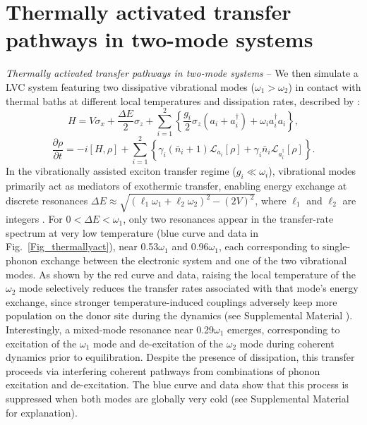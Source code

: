 \documentclass[
reprint,
superscriptaddress,

amsmath,amssymb,
aps,
prl,

floatfix,
]{revtex4-2}
\begin{document}
\section{Thermally activated transfer pathways in two-mode systems}
\fi
\emph{Thermally activated transfer pathways in two-mode systems} -- We then simulate a LVC system featuring two dissipative vibrational modes ($\omega_1>
\omega_2$) in contact with thermal baths at different local temperatures and dissipation rates, described by \cite{so2025multimode}:
\begin{equation}
    H \!= V\sigma_x\! + \frac{\Delta E}{2}\sigma_z \!+ \sum_{i=1}^2\left\{\frac{g_i}{2}\sigma_z\!\left(a_i+a^\dag_i\right)\!+\omega_i a^\dag_i a_i\right\},
    \label{eq_H2M}
\end{equation}
\begin{equation}
    \frac{\partial\rho}{\partial t}\!=-i[H,\rho] +\sum_{i=1}^2\left\{\gamma_i (\bar{n}_i\!+\!1)\mathcal{L}_{a_i}[\rho] + \gamma_i \bar{n}_i \mathcal{L}_{a^\dagger_i}[\rho]\right\}.
    \label{eq_master2M}
\end{equation}
In the vibrationally assisted exciton transfer regime ($g_i\ll\omega_i$), vibrational modes primarily act as mediators of exothermic transfer, enabling energy exchange at discrete resonances $\Delta E \approx \sqrt{(\ell_1\omega_1 + \ell_2\omega_2)^2-(2V)^2}$, where $\ell_1$ and $\ell_2$ are integers \cite{so2025multimode}. For $0<\Delta E<\omega_1$, only two resonances appear in the transfer-rate spectrum at very low temperature (blue curve and data in Fig.~\ref{Fig_thermallyact}), near 0.53$\omega_1$ and 0.96$\omega_1$, each corresponding to single-phonon exchange between the electronic system and one of the two vibrational modes. As shown by the red curve and data, raising the local temperature of the $\omega_2$ mode selectively reduces the transfer rates associated with that mode’s energy exchange, since stronger temperature-induced couplings adversely keep more population on the donor site during the dynamics (see Supplemental Material \cite{so2025fT_supp}). Interestingly, a mixed-mode resonance near 0.29$\omega_1$ emerges, corresponding to excitation of the $\omega_1$ mode and de-excitation of the $\omega_2$ mode during coherent dynamics prior to equilibration. Despite the presence of dissipation, this transfer proceeds via interfering coherent pathways from combinations of phonon excitation and de-excitation. The blue curve and data show that this process is suppressed when both modes are globally very cold (see Supplemental Material \cite{so2025fT_supp} for explanation).
\end{document}

